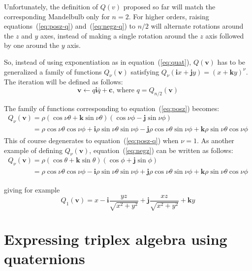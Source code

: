 \documentclass{article}
\let\vec\mathbf
\let\bar\overline
\newcommand{\mathnewline}[1][\quad]{\\\phantom{#1}}
\newcommand{\where}{\text{, where }}
\begin{document}
Unfortunately, the definition of $Q(v)$ proposed so far will match the
corresponding Mandelbulb only for $n=2$.  For higher orders, raising
equations~(\ref{eq:posz-q}) and~(\ref{eq:negz-q}) to $n/2$ will
alternate rotations around the $z$ and $y$ axes, instead of making a
single rotation around the $z$ axis followed by one around the $y$
axis.

So, instead of using exponentiation as in equation~(\ref{eq:quat}),
$Q(\vec{v})$ has to be generalized a family of functions
$Q_\nu(\vec{v})$ satisfying $Q_\nu(\vec{i}x+\vec{j}y) =
(x+\vec{k}y)^\nu$.  The iteration will be defined as follows:
\begin{equation*}
\vec{v}\leftarrow q\vec{i}\bar q+\vec{c} \where q=Q_{n/2}(\vec{v})
\end{equation*}

\noindent
The family of functions corresponding to equation~(\ref{eq:posz})
becomes:
\begin{equation*}
  \begin{array}{l}
  Q_\nu(\vec{v}) = \rho (\cos \nu\theta + \vec{k} \sin \nu\theta) (\cos \nu\phi - \vec{j} \sin \nu\phi)
  \mathnewline[Q_\nu(\vec{v})] = \rho \cos \nu\theta \cos \nu\phi + \vec{i} \rho \sin \nu\theta \sin \nu\phi - \vec{j} \rho \cos \nu\theta \sin \nu\phi + \vec{k} \rho \sin \nu\theta \cos \nu\phi
  \end{array}
\end{equation*}
\noindent
This of course degenerates to equation~(\ref{eq:posz-q}) when
$\nu=1$. As another example of defining $Q_\nu(\vec{v})$,
equation~(\ref{eq:negz}) can be written as follows:
\begin{equation*}
  \label{eq:negz-q}
  \begin{array}{l}
  Q_\nu(\vec{v}) = \rho (\cos \theta + \vec{k} \sin \theta) (\cos \phi + \vec{j} \sin \phi)
  \mathnewline[Q_\nu(\vec{v})] = \rho \cos \nu\theta \cos \nu\phi - \vec{i} \rho \sin \nu\theta \sin \nu\phi + \vec{j} \rho \cos \nu\theta \sin \nu\phi + \vec{k} \rho \sin \nu\theta \cos \nu\phi
  \end{array}
\end{equation*}
 
\noindent
giving for example
\begin{equation*}
  Q_1(\vec{v}) = x - \vec{i}\frac{y z}{\sqrt{x^2 + y^2}} + \vec{j}\frac{x z}{\sqrt{x^2 + y^2}} + \vec{k} y
\end{equation*}

\section{Expressing triplex algebra using quaternions}
\label{sec:quatplex}
\end{document}
